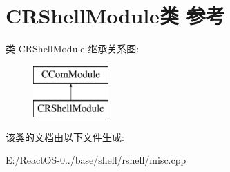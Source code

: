 \hypertarget{class_c_r_shell_module}{}\section{C\+R\+Shell\+Module类 参考}
\label{class_c_r_shell_module}
类 C\+R\+Shell\+Module 继承关系图\+:\begin{figure}[H]
\begin{center}
\leavevmode
\includegraphics[height=2.000000cm]{class_c_r_shell_module}
\end{center}
\end{figure}


该类的文档由以下文件生成\+:\begin{DoxyCompactItemize}
\item 
E\+:/\+React\+O\+S-\/0../base/shell/rshell/misc.\+cpp\end{DoxyCompactItemize}
